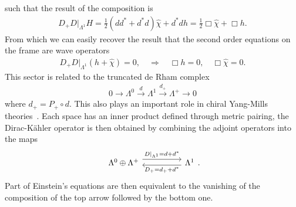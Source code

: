 \documentclass[10pt]{report}
\theoremstyle{definition}
\begin{document}
        such that the result of the composition is 
        \begin{align}
            D_+ D|_{\Lambda^1} H = \frac{1}{2}(d d^* + d^* d) \hat{\chi} + d^*  d h = \frac{1}{2} \Box \hat{\chi} + \Box h.
        \end{align}
        From which we can easily recover the result that the second order equations on the frame are wave operators
        \begin{align}
            D_+ D|_{\Lambda^1} (h+\hat{\chi}) = 0, \quad \Rightarrow \quad \Box h = 0, \quad \Box \hat{\chi} = 0.
        \end{align}
        This sector is related to the truncated de Rham complex 
        \begin{align}
            0 \longrightarrow \Lambda^0 \overset{d}{\longrightarrow} \Lambda^1 \overset{d_+}{\longrightarrow} \Lambda^+ \longrightarrow 0
        \end{align}
        where $d_+ = P_+ \circ d$. This also plays an important role in chiral Yang-Mills theories~\cite{AtiyahHitchinSingerSelfDual1978}. Each space has an inner product defined through metric pairing, the Dirac-K\"ahler operator is then obtained by combining the adjoint operators into the maps 
        \begin{equation}
            \begin{tikzcd}
                \Lambda^0 \oplus \Lambda^+ \arrow[rr, "D|_{\Lambda^1} = d+d^*", shift left=2] &  & \Lambda^1 \arrow[ll, "D_+ =d_+ + d^*", shift left]
            \end{tikzcd}.
        \end{equation}
        Part of Einstein's equations are then equivalent to the vanishing of the composition of the top arrow followed by the bottom one.
\end{document}

